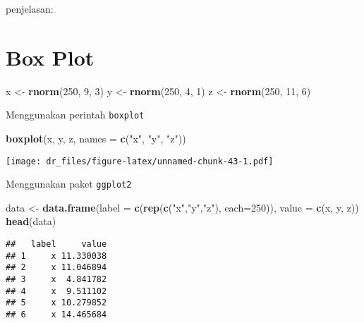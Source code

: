 \documentclass[
]{book}
\newenvironment{Shaded}{\begin{snugshade}}{\end{snugshade}}
\newcommand{\DataTypeTok}[1]{\textcolor[rgb]{0.13,0.29,0.53}{#1}}
\newcommand{\DecValTok}[1]{\textcolor[rgb]{0.00,0.00,0.81}{#1}}
\newcommand{\KeywordTok}[1]{\textcolor[rgb]{0.13,0.29,0.53}{\textbf{#1}}}
\newcommand{\NormalTok}[1]{#1}
\newcommand{\StringTok}[1]{\textcolor[rgb]{0.31,0.60,0.02}{#1}}
\begin{document}
penjelasan:

\hypertarget{box-plot}{%
\section{Box Plot}\label{box-plot}}

\begin{Shaded}
\begin{Highlighting}[]
\NormalTok{x <-}\StringTok{ }\KeywordTok{rnorm}\NormalTok{(}\DecValTok{250}\NormalTok{, }\DecValTok{9}\NormalTok{, }\DecValTok{3}\NormalTok{)}
\NormalTok{y <-}\StringTok{ }\KeywordTok{rnorm}\NormalTok{(}\DecValTok{250}\NormalTok{, }\DecValTok{4}\NormalTok{, }\DecValTok{1}\NormalTok{)}
\NormalTok{z <-}\StringTok{ }\KeywordTok{rnorm}\NormalTok{(}\DecValTok{250}\NormalTok{, }\DecValTok{11}\NormalTok{, }\DecValTok{6}\NormalTok{)}
\end{Highlighting}
\end{Shaded}

Menggunakan perintah \texttt{boxplot}

\begin{Shaded}
\begin{Highlighting}[]
\KeywordTok{boxplot}\NormalTok{(x, y, z,}
        \DataTypeTok{names =} \KeywordTok{c}\NormalTok{(}\StringTok{"x"}\NormalTok{, }\StringTok{"y"}\NormalTok{, }\StringTok{"z"}\NormalTok{))}
\end{Highlighting}
\end{Shaded}

\texttt{[image: dr\_files/figure-latex/unnamed-chunk-43-1.pdf]}

Menggunakan paket \texttt{ggplot2}

\begin{Shaded}
\begin{Highlighting}[]
\NormalTok{data <-}\StringTok{ }\KeywordTok{data.frame}\NormalTok{(}\DataTypeTok{label =} \KeywordTok{c}\NormalTok{(}\KeywordTok{rep}\NormalTok{(}\KeywordTok{c}\NormalTok{(}\StringTok{"x"}\NormalTok{,}\StringTok{"y"}\NormalTok{,}\StringTok{"z"}\NormalTok{),}
                                 \DataTypeTok{each=}\DecValTok{250}\NormalTok{)),}
                   \DataTypeTok{value =} \KeywordTok{c}\NormalTok{(x, y, z))}
\KeywordTok{head}\NormalTok{(data)}
\end{Highlighting}
\end{Shaded}

\begin{verbatim}
##   label     value
## 1     x 11.330038
## 2     x 11.046894
## 3     x  4.841782
## 4     x  9.511102
## 5     x 10.279852
## 6     x 14.465684
\end{verbatim}
\end{document}
